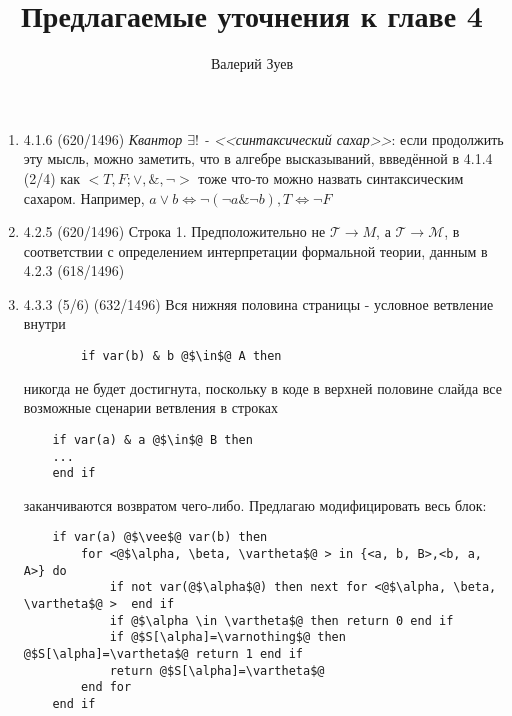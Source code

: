 \documentclass[a4paper,12pt]{article} %
\begin{document}
\author{Валерий Зуев} %
\title{Предлагаемые уточнения к главе 4}
\maketitle
\begin{enumerate}
	\item{4.1.6 (620/1496)} \textit{Квантор $\exists!$ - <<синтаксический сахар>>}: если продолжить эту мысль, можно заметить, что в алгебре высказываний, ввведённой в 4.1.4 (2/4) как $<{T,F}; \vee, \&, \neg>$ тоже что-то можно назвать синтаксическим сахаром. Например, $a\vee b \Leftrightarrow \neg(\neg a \& \neg b), T \Leftrightarrow \neg F$
	\item{4.2.5 (620/1496)} Строка 1. Предположительно не $\mathcal{T}\rightarrow M$, а  $\mathcal{T}\rightarrow\mathcal{M}$, в соответствии с определением интерпретации формальной теории, данным в 4.2.3 (618/1496)
	\item {4.3.3 (5/6) (632/1496)} Вся нижняя половина страницы - условное ветвление внутри 
	\begin{lstlisting}
		if var(b) & b @$\in$@ A then
	\end{lstlisting}
	никогда не будет достигнута, поскольку в коде в верхней половине слайда все возможные сценарии ветвления в строках
	\begin{lstlisting}
	if var(a) & a @$\in$@ B then
	...
	end if
	\end{lstlisting}
	заканчиваются возвратом чего-либо. Предлагаю модифицировать весь блок:
	\begin{lstlisting}
	if var(a) @$\vee$@ var(b) then
		for <@$\alpha, \beta, \vartheta$@ > in {<a, b, B>,<b, a, A>} do
			if not var(@$\alpha$@) then next for <@$\alpha, \beta, \vartheta$@ >  end if
			if @$\alpha \in \vartheta$@ then return 0 end if
			if @$S[\alpha]=\varnothing$@ then @$S[\alpha]=\vartheta$@ return 1 end if
			return @$S[\alpha]=\vartheta$@
		end for
	end if
	\end{lstlisting}
\end{enumerate}
\end{document}
